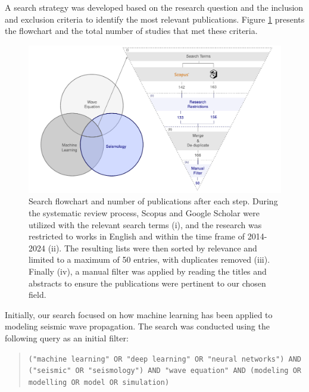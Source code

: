 \documentclass[11pt,twoside]{article}
\begin{document}
A search strategy was developed based on the research question and the inclusion and exclusion criteria to 
identify the most relevant publications. Figure \ref{fig:scheme_systematic_review} presents the flowchart and 
the total number of studies that met these criteria.

\begin{figure}[h]
    \includegraphics[width=1.0\textwidth]{figs/scheme_systematic_review_euler_diagram.pdf}
\caption{Search flowchart and number of publications after each step. During the systematic review process, 
Scopus and Google Scholar were utilized with the relevant search terms (i), and the research was restricted to works 
in English and within the time frame of 2014-2024 (ii). The resulting lists were then sorted by relevance and limited 
to a maximum of 50 entries, with duplicates removed (iii). Finally (iv), a manual filter was applied by reading the 
titles and abstracts to ensure the publications were pertinent to our chosen field.}\label{fig:scheme_systematic_review}
\end{figure}

Initially, our search focused on how machine learning has been applied to modeling seismic wave propagation. 
The search was conducted using the following query as an initial filter:

\vspace*{2mm}

\begin{tcolorbox}[colback=gray!20, colframe=gray!20, sharp corners]
\begin{quote}
\noindent\texttt{("machine learning" OR "deep learning" OR "neural networks") AND ("seismic" OR 
"seismology") AND "wave equation" AND (modeling OR modelling OR model OR simulation)}
\end{quote}
\end{tcolorbox}
\end{document}
